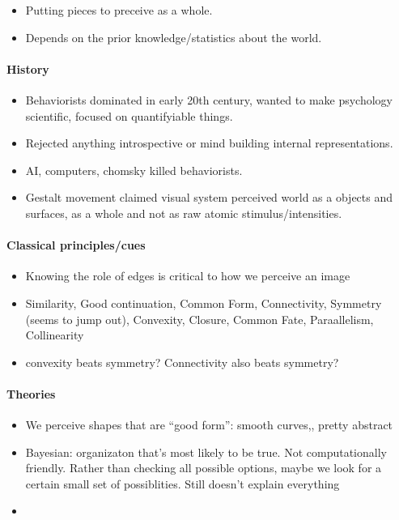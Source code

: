 \begin{itemize}
\item Putting pieces to preceive as a whole.
\item Depends on the prior knowledge/statistics about the world.
\end{itemize}

\paragraph{History}
  \begin{itemize}
  \item Behaviorists dominated in early 20th century, wanted to make
    psychology scientific, focused on quantifyiable things.
  \item Rejected anything introspective or mind building internal representations.
  \item AI, computers, chomsky killed behaviorists.
  \item Gestalt movement claimed visual system perceived world as a
    objects and surfaces, as a whole and not as raw atomic stimulus/intensities.
  \end{itemize}
\paragraph{Classical principles/cues}
  \begin{itemize}
  \item Knowing the role of edges is critical to how we perceive an image
  \item Similarity, Good continuation, Common Form, Connectivity, Symmetry (seems
    to jump out), Convexity, Closure, Common Fate, Paraallelism, Collinearity
  \item convexity beats symmetry? Connectivity also beats symmetry?
  \end{itemize}

  \paragraph{Theories}
  \begin{itemize}
  \item We perceive shapes that are ``good form'': smooth curves,,
    pretty abstract
  \item Bayesian: organizaton that's most likely to be true. Not
    computationally friendly. Rather than checking all possible
    options, maybe we look for a certain small set of
    possiblities. Still doesn't explain everything
  \item 
  \end{itemize}
  
